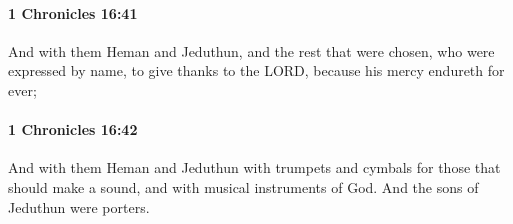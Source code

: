 		\paragraph{1 Chronicles 16:41} %
			\label{1CHRONICLES-16-41}

			And with them Heman and Jeduthun, and the rest that were chosen, who were expressed by name, to give thanks to the LORD, because his mercy endureth for ever;


		\paragraph{1 Chronicles 16:42} %
			\label{1CHRONICLES-16-42}

			And with them Heman and Jeduthun with trumpets and cymbals for those that should make a sound, and with musical instruments of God. And the sons of Jeduthun were porters.


